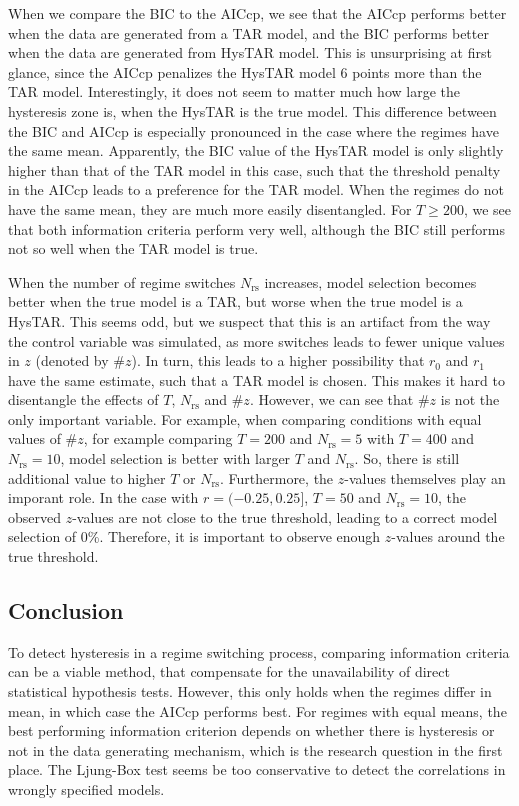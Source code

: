 \documentclass{article}
\begin{document}
When we compare the BIC to the AICcp, we see that the AICcp performs better when the data are generated from a TAR model, and the BIC performs better when the data are generated from HysTAR model. This is unsurprising at first glance, since the AICcp penalizes the HysTAR model 6 points more than the TAR model. Interestingly, it does not seem to matter much how large the hysteresis zone is, when the HysTAR is the true model.
	This difference between the BIC and AICcp is especially pronounced in the case where the regimes have the same mean. Apparently, the BIC value of the HysTAR model is only slightly higher than that of the TAR model in this case, such that the threshold penalty in the AICcp leads to a preference for the TAR model. 
	When the regimes do not have the same mean, they are much more easily disentangled. For $T\ge 200$, we see that both information criteria perform very well, although the BIC still performs not so well when the TAR model is true.

When the number of regime switches $N_{\mathrm{rs}}$ increases, model selection becomes better when the true model is a TAR, but worse when the true model is a HysTAR. 
This seems odd, but we suspect that this is an artifact from the way the control variable was simulated, as more switches leads to fewer unique values in $z$ (denoted by \#$z$). In turn, this leads to a higher possibility that $r_0$ and $r_1$ have the same estimate, such that a TAR model is chosen.
This makes it hard to disentangle the effects of $T$, $N_{\mathrm{rs}}$ and \#$z$.
However, we can see that \#$z$ is not the only important variable.
For example, when comparing conditions with equal values of \#$z$, for example comparing $T = 200$ and $N_{\mathrm{rs}} = 5$ with $T = 400$ and $N_{\mathrm{rs}} = 10$, model selection is better with larger $T$ and $N_{\mathrm{rs}}$.
So, there is still additional value to higher $T$ or $N_{\mathrm{rs}}$.
Furthermore, the $z$-values themselves play an imporant role. 
In the case with $r = (-0.25, 0.25]$, $T = 50$ and $N_{\mathrm{rs}} = 10$, the observed $z$-values are not close to the true threshold, leading to a correct model selection of 0\%.
Therefore, it is important to observe enough $z$-values around the true threshold.

\subsection{Conclusion}
To detect hysteresis in a regime switching process, comparing information criteria can be a viable method, that compensate for the unavailability of direct statistical hypothesis tests. However, this only holds when the regimes differ in mean, in which case the AICcp performs best. For regimes with equal means, the best performing information criterion depends on whether there is hysteresis or not in the data generating mechanism, which is the research question in the first place. The Ljung-Box test seems be too conservative to detect the correlations in wrongly specified models.
\end{document}
